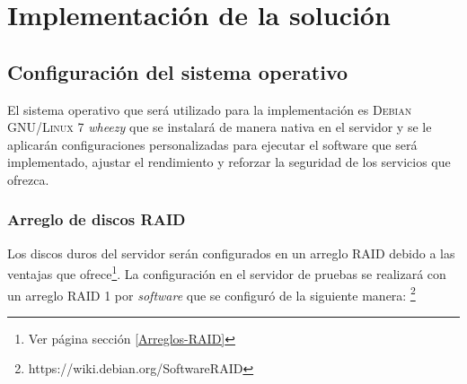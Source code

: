{
  \linespread{1}
  \cleardoublepage  
  \chapter{Implementaci\'{o}n de la soluci\'{o}n}
  \label{chap:cap3}
}

    \section {Configuraci\'{o}n del sistema operativo}

El sistema operativo que ser\'{a} utilizado para la implementaci\'{o}n es \textsc{Debian GNU/Linux} 7 \textit{\guillemotleft wheezy\guillemotright} que se instalar\'{a} de manera nativa en el servidor y se le aplicar\'{a}n configuraciones personalizadas para ejecutar el software que ser\'{a} implementado, ajustar el rendimiento y reforzar la seguridad de los servicios que ofrezca.

      \subsection {Arreglo de discos \textsc{RAID}}

Los discos duros del servidor ser\'{a}n configurados en un arreglo \textsc{RAID} debido a las ventajas que ofrece\footnote{Ver p\'{a}gina \pageref{Arreglos-RAID} secci\'{o}n \ref{Arreglos-RAID}}. La configuraci\'{o}n en el servidor de pruebas se realizar\'{a} con un arreglo \textsc{RAID} 1 por \textit{software} que se configur\'{o} de la siguiente manera: \footnote{https://wiki.debian.org/SoftwareRAID}

